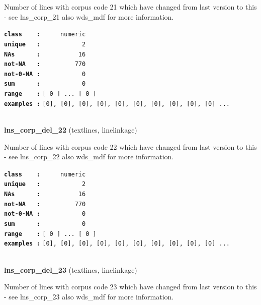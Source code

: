 \documentclass[]{article}
\begin{document}
Number of lines with corpus code 21 which have changed from last version
to this - see lns\_corp\_21 also wds\_mdf for more information.

\textbf{\texttt{class\ \ \ \ :}} \texttt{~~~~~numeric}\\
\textbf{\texttt{unique\ \ \ :}} \texttt{~~~~~~~~~~~2}\\
\textbf{\texttt{NAs\ \ \ \ \ \ :}} \texttt{~~~~~~~~~~16}\\
\textbf{\texttt{not-NA\ \ \ :}} \texttt{~~~~~~~~~770}\\
\textbf{\texttt{not-0-NA\ :}} \texttt{~~~~~~~~~~~0}\\
\textbf{\texttt{sum\ \ \ \ \ \ :}} \texttt{~~~~~~~~~~~0}\\
\textbf{\texttt{range\ \ \ \ :}}
\texttt{{[}\ 0\ {]}\ ...\ {[}\ 0\ {]}}\\
\textbf{\texttt{examples\ :}}
\texttt{{[}0{]},\ {[}0{]},\ {[}0{]},\ {[}0{]},\ {[}0{]},\ {[}0{]},\ {[}0{]},\ {[}0{]},\ {[}0{]},\ {[}0{]}\ ...}\\

~

\textbf{lns\_corp\_del\_22} (textlines, linelinkage)

Number of lines with corpus code 22 which have changed from last version
to this - see lns\_corp\_22 also wds\_mdf for more information.

\textbf{\texttt{class\ \ \ \ :}} \texttt{~~~~~numeric}\\
\textbf{\texttt{unique\ \ \ :}} \texttt{~~~~~~~~~~~2}\\
\textbf{\texttt{NAs\ \ \ \ \ \ :}} \texttt{~~~~~~~~~~16}\\
\textbf{\texttt{not-NA\ \ \ :}} \texttt{~~~~~~~~~770}\\
\textbf{\texttt{not-0-NA\ :}} \texttt{~~~~~~~~~~~0}\\
\textbf{\texttt{sum\ \ \ \ \ \ :}} \texttt{~~~~~~~~~~~0}\\
\textbf{\texttt{range\ \ \ \ :}}
\texttt{{[}\ 0\ {]}\ ...\ {[}\ 0\ {]}}\\
\textbf{\texttt{examples\ :}}
\texttt{{[}0{]},\ {[}0{]},\ {[}0{]},\ {[}0{]},\ {[}0{]},\ {[}0{]},\ {[}0{]},\ {[}0{]},\ {[}0{]},\ {[}0{]}\ ...}\\

~

\textbf{lns\_corp\_del\_23} (textlines, linelinkage)

Number of lines with corpus code 23 which have changed from last version
to this - see lns\_corp\_23 also wds\_mdf for more information.
\end{document}
